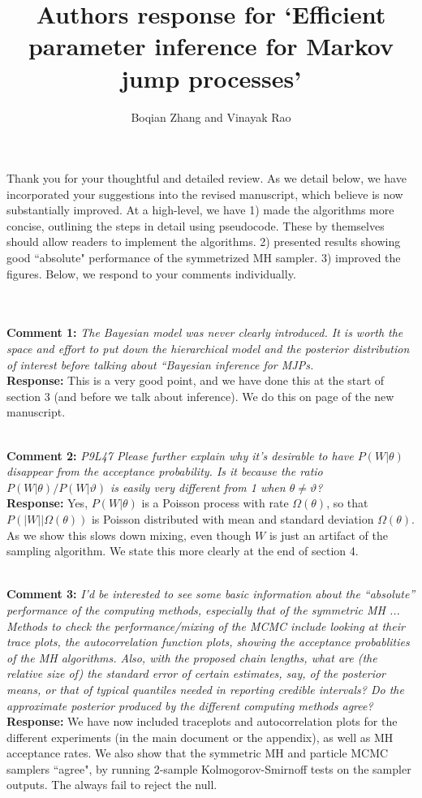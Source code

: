 \documentclass[11pt]{article}
\title{Authors response for `Efficient parameter inference for Markov jump processes'}
\author{Boqian Zhang and Vinayak Rao }
\date{}
\newcommand{\rev}[2]{\textbf{Comment #1: }\emph{#2}}
\newcommand{\resp}{\textbf{Response: }}
\begin{document}
\maketitle

Thank you for your thoughtful and detailed review. As we detail below, we have incorporated your suggestions into the revised manuscript, which believe is now substantially improved. At a high-level, we have 1) made the algorithms more concise, outlining the steps in detail using pseudocode. These by themselves should allow readers to implement the algorithms. 2) presented results showing good ``absolute" performance of the symmetrized MH sampler. 3) improved the figures.
Below, we respond to your comments individually.

~\\~\\

\noindent \rev{1}{The Bayesian model was never clearly introduced. It is worth the space and effort to put down the hierarchical model and the posterior distribution of interest before talking about “Bayesian inference for MJPs.} \\
\resp This is a very good point, and we have done this at the start of section 3 (and before we talk about inference).
We do this on page of the new manuscript. 

~\\
\rev{2}{P9L47 Please further explain why it’s desirable to have $P(W|\theta)$ disappear from the acceptance probability. Is it because the ratio 
$P(W|\theta)/P(W |\vartheta)$ is easily very different from 1 when $\theta \neq \vartheta$?} \\
\resp Yes, $P(W|\theta)$ is a Poisson process with rate $\Omega(\theta)$, so that $P(|W||\Omega(\theta))$ is Poisson distributed with mean and standard deviation $\Omega(\theta)$. As we show this slows down mixing, even though $W$ is just an artifact of the sampling algorithm.
We state this more clearly at the end of section 4.

~\\ 
\rev{3}{I’d be interested to see some basic information about the “absolute” performance of the computing methods, especially that of the symmetric MH ... Methods to check the performance/mixing of the MCMC include looking at their trace plots, the autocorrelation function plots, showing the acceptance probablities of the MH algorithms. Also, with the proposed chain lengths, what are (the relative size of) the standard error of certain estimates, say, of the posterior means, or that of typical quantiles needed in reporting credible intervals? Do the approximate posterior produced by the different computing methods agree? }
\\
\resp We have now included traceplots and autocorrelation plots for the different experiments (in the main document or the appendix), as well as MH acceptance rates. We also show that the symmetric MH and particle MCMC samplers ``agree", by running 2-sample Kolmogorov-Smirnoff tests on the sampler outputs. The always fail to reject the null.
\end{document}
